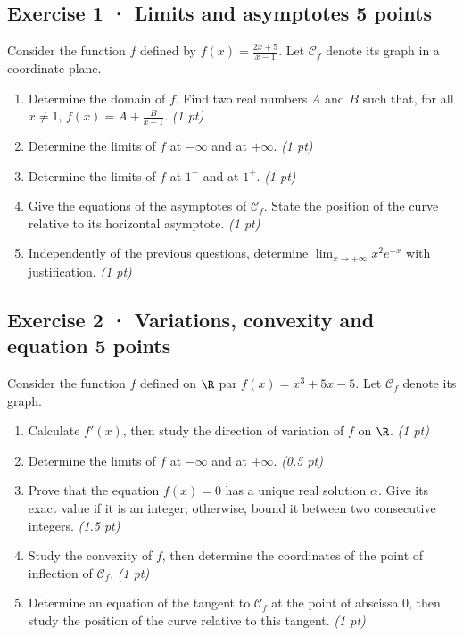 \subsection*{Exercise 1 · Limits and asymptotes \hfill 5 points}Consider the function $f$ defined by $f(x)=\frac{2x+5}{x-1}$. Let $\mathcal C_f$ denote its graph in a coordinate plane.

\begin{enumerate}

\item Determine the domain of $f$. Find two real numbers $A$ and $B$ such that, for all $x\ne1$, $f(x)=A+\frac B{x-1}$. \hfill\textit{(1 pt)}

\item Determine the limits of $f$ at $-\infty$ and at $+\infty$. \hfill\textit{(1 pt)}

\item Determine the limits of $f$ at $1^-$ and at $1^+$. \hfill\textit{(1 pt)}

\item Give the equations of the asymptotes of $\mathcal C_f$. State the position of the curve relative to its horizontal asymptote. \hfill\textit{(1 pt)}

\item Independently of the previous questions, determine $\displaystyle\lim_{x\to+\infty}x^{2}e^{-x}$ with justification. \hfill\textit{(1 pt)}

\end{enumerate}

\subsection*{Exercise 2 · Variations, convexity and equation \hfill 5 points}Consider the function $f$ defined on $\R$ par $f(x)=x^3+5x-5$. Let $\mathcal C_f$ denote its graph.

\begin{enumerate}

\item Calculate $f' (x)$, then study the direction of variation of $f$ on $\R$. \hfill\textit{(1 pt)}

\item Determine the limits of $f$ at $-\infty$ and at $+\infty$. \hfill\textit{(0.5 pt)}

\item Prove that the equation $f(x)=0$ has a unique real solution $\alpha$. Give its exact value if it is an integer; otherwise, bound it between two consecutive integers. \hfill\textit{(1.5 pt)}

\item Study the convexity of $f$, then determine the coordinates of the point of inflection of $\mathcal C_f$. \hfill\textit{(1 pt)}

\item Determine an equation of the tangent to $\mathcal C_f$ at the point of abscissa $0$, then study the position of the curve relative to this tangent. \hfill\textit{(1 pt)}

\end{enumerate}


